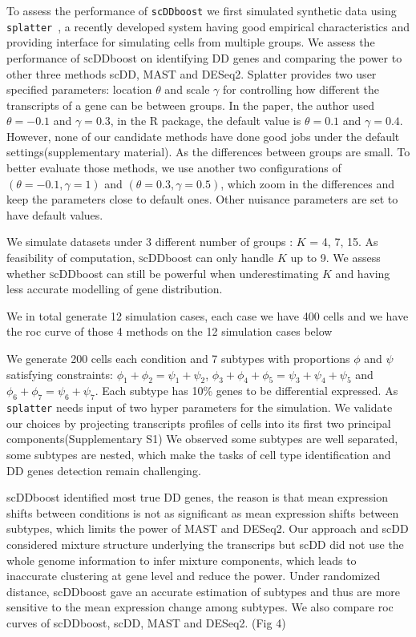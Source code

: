 \documentclass[aoas,preprint]{imsart}
\begin{document}
To assess the performance of \verb+scDDboost+ we first  simulated
synthetic data using \verb+splatter+~\citep{ref:Zappia}, 
a recently developed system having good empirical characteristics 
and providing interface for simulating cells from multiple groups. 
We assess the performance of \textsc scDDboost on identifying DD genes and comparing the power to other three methods scDD, MAST and DESeq2.
Splatter provides two user specified parameters: location $\theta$ and scale $\gamma$ for controlling how different the transcripts of a gene can be between groups. 
In the paper, the author used $\theta = -0.1$ and $\gamma = 0.3$, in the R package, the default value is $\theta = 0.1$ and $\gamma = 0.4$.  
However, none of our candidate methods have done good jobs under the default settings(supplementary material). As the differences between groups are small. 
To better evaluate those methods, we use another two configurations of $(\theta = -0.1, \gamma = 1)$ and $(\theta = 0.3, \gamma = 0.5)$, which zoom in the differences and keep the parameters close to default ones.
Other nuisance parameters are set to have default values.
 
We simulate datasets under 3 different number of groups : $K$ =  4, 7, 15.  As feasibility of computation, \textsc scDDboost can only handle $K$ up to 9. We assess whether \textsc scDDboost 
can still be powerful when underestimating $K$ and having less accurate modelling of gene distribution. 

We in total generate 12 simulation cases, each case we have 400 cells and we have the roc curve of those 4 methods on the 12 simulation cases below
 
We generate 200 cells each condition 
and 7 subtypes with proportions $\phi$ and $\psi$ satisfying constraints: $\phi_1 + \phi_2 = \psi_1 + \psi_2$, $\phi_3 + \phi_4 +\phi_5 = \psi_3 + \psi_4 + \psi_5$ and $\phi_6 + \phi_7 = \psi_6 + \psi_7$. 
Each subtype has 10\% genes to be differential expressed. 
As \verb+splatter+ needs input of two hyper parameters for the simulation. We validate our choices by projecting transcripts profiles of cells into its first two principal components(Supplementary S1)
We observed some subtypes are well separated, some subtypes are nested, which make the tasks of cell type identification and DD genes detection remain challenging. 



scDDboost identified most true DD genes, the reason is that mean expression shifts between conditions is not as significant as mean expression shifts between subtypes, which limits the power of MAST and DESeq2. Our approach and scDD considered mixture structure underlying the transcrips but scDD did not use the whole genome information to infer mixture components, which leads to inaccurate clustering at gene level and reduce the power. Under randomized distance, scDDboost gave an accurate estimation of subtypes and thus are more sensitive to the mean expression change among subtypes. We also compare roc curves of scDDboost, scDD, MAST and DESeq2. (Fig 4)
\end{document}
